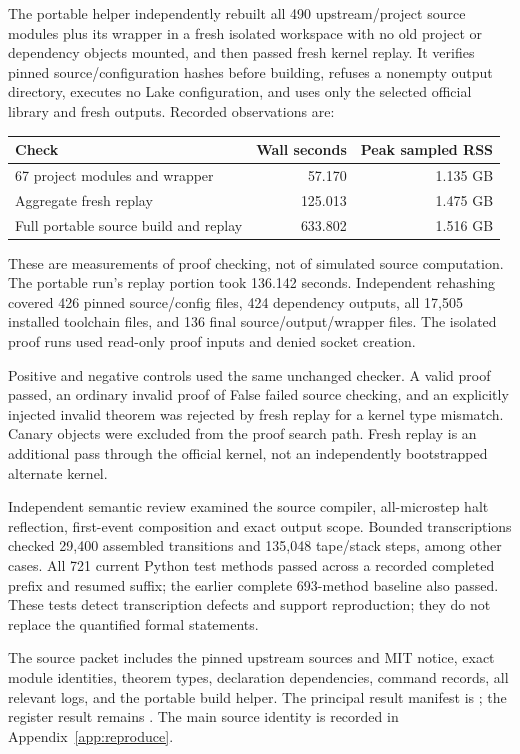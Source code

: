 The portable helper independently rebuilt all 490 upstream/project source
modules plus its wrapper in a fresh isolated workspace with no old project or
dependency objects mounted, and then passed fresh kernel replay. It verifies
pinned source/configuration hashes before building, refuses a nonempty output
directory, executes no Lake configuration, and uses only the selected official
library and fresh outputs. Recorded observations are:
\begin{center}
\begin{tabular}{lrr}
\toprule
Check & Wall seconds & Peak sampled RSS\\
\midrule
67 project modules and wrapper & 57.170 & 1.135 GB\\
Aggregate fresh replay & 125.013 & 1.475 GB\\
Full portable source build and replay & 633.802 & 1.516 GB\\
\bottomrule
\end{tabular}
\end{center}
These are measurements of proof checking, not of simulated source computation.
The portable run's replay portion took 136.142 seconds. Independent rehashing
covered 426 pinned source/config files, 424 dependency outputs, all 17,505
installed toolchain files, and 136 final source/output/wrapper files. The
isolated proof runs used read-only proof inputs and denied socket creation.

Positive and negative controls used the same unchanged checker. A valid proof
passed, an ordinary invalid proof of False failed source checking, and an
explicitly injected invalid theorem was rejected by fresh replay for a kernel
type mismatch. Canary objects were excluded from the proof search path.
Fresh replay is an additional pass through the official kernel, not an
independently bootstrapped alternate kernel.

Independent semantic review examined the source compiler, all-microstep halt
reflection, first-event composition and exact output scope. Bounded transcriptions
checked 29,400 assembled transitions and 135,048 tape/stack steps, among other
cases. All 721 current Python test methods passed across a recorded completed
prefix and resumed suffix; the earlier complete 693-method baseline also
passed. These tests detect transcription defects and support reproduction;
they do not replace the quantified formal statements.

The source packet includes the pinned upstream sources and MIT notice, exact
module identities, theorem types, declaration dependencies, command records,
all relevant logs, and the portable build helper. The principal result manifest
is ; the register result remains
. The main source identity is recorded
in Appendix~\ref{app:reproduce}.

